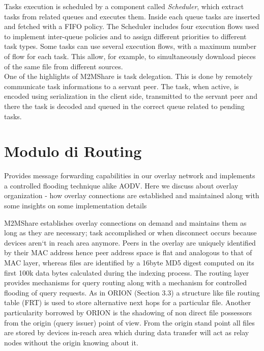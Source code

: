 Tasks execution is scheduled by a component called \textit{Scheduler}, which extract tasks from related queues and executes them. Inside each queue tasks are inserted and fetched with a FIFO policy. The Scheduler includes four execution flows used to implement inter-queue policies and to assign different priorities to different task types. Some tasks can use several execution flows, with a maximum number of flow for each task. This allow, for example, to simultaneously download pieces of the same file from different sources.
\\

One of the highlights of M2MShare is task delegation. This is done by remotely communicate task informations to a servant peer. The task, when active, is encoded using serialization in the client side, transmitted to the servant peer and there the task is decoded and queued in the correct queue related to pending tasks.



\section{Modulo di Routing}
Provides message forwarding capabilities in our overlay network and implements a controlled flooding technique alike AODV. Here we discuss about overlay organization - how overlay connections are established and maintained along with some insights on some implementation details

\cite{orion}
\cite{aodv}
M2MShare establishes overlay connections on demand and maintains them as long as
they are necessary; task accomplished or when disconnect occurs because devices aren‘t
in reach area anymore. Peers in the overlay are uniquely identified by their MAC
address hence peer address space is flat and analogous to that of MAC layer, whereas
files are identified by a 16byte MD5 digest computed on its first 100k data bytes
calculated during the indexing process.
The routing layer provides mechanisms for query routing along with a mechanism for
controlled flooding of query requests. As in ORION (Section 3.3) a structure like file
routing table (FRT) is used to store alternative next hops for a particular file. Another
particularity borrowed by ORION is the shadowing of non direct file possessors from
the origin (query issuer) point of view. From the origin stand point all files are stored by
devices in-reach area which during data transfer will act as relay nodes without the
origin knowing about it.

